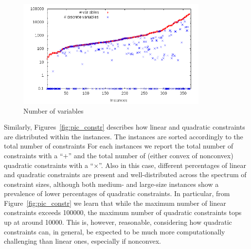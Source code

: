 \begin{figure}\centering
  \includegraphics[width=0.85\textwidth]{pic_var.png}
  \caption{Number of variables \label{fig:pic_var}}
\end{figure}

%
%

Similarly, Figures~\ref{fig:pic_constr} 
describes how linear and quadratic
constraints are distributed within the instances. The instances are sorted
accordingly to the total number of constraints
For each instances we report the total number of constraints with a ``$+$''
and the total number of (either convex of nonconvex) quadratic constraints
with a ``$\times$''. Also in this case, different percentages of linear and
quadratic constraints are present and well-distributed across the spectrum
of constraint sizes, although both medium- and large-size instances show a
prevalence of lower percentages of quadratic constraints. In particular,
from Figure~\ref{fig:pic_constr} we learn that while the maximum number
of linear constraints exceeds 100000, the maximum number of quadratic
constraints tops up at around 10000. This is, however, reasonable, considering
how quadratic constraints can, in general, be expected to be much more
computationally challenging than linear ones, especially if nonconvex.

